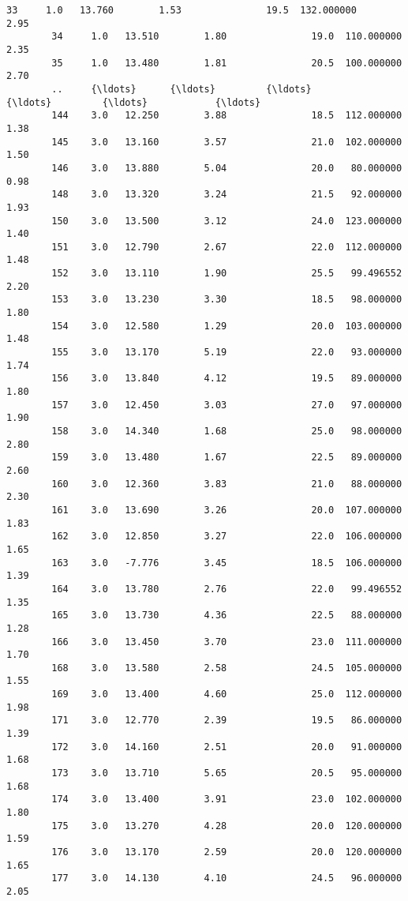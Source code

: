 \documentclass[11pt]{article}
\begin{document}
\begin{Verbatim}[commandchars=\\\{\}]
        33     1.0   13.760        1.53               19.5  132.000000           2.95   
        34     1.0   13.510        1.80               19.0  110.000000           2.35   
        35     1.0   13.480        1.81               20.5  100.000000           2.70   
        ..     {\ldots}      {\ldots}         {\ldots}                {\ldots}         {\ldots}            {\ldots}   
        144    3.0   12.250        3.88               18.5  112.000000           1.38   
        145    3.0   13.160        3.57               21.0  102.000000           1.50   
        146    3.0   13.880        5.04               20.0   80.000000           0.98   
        148    3.0   13.320        3.24               21.5   92.000000           1.93   
        150    3.0   13.500        3.12               24.0  123.000000           1.40   
        151    3.0   12.790        2.67               22.0  112.000000           1.48   
        152    3.0   13.110        1.90               25.5   99.496552           2.20   
        153    3.0   13.230        3.30               18.5   98.000000           1.80   
        154    3.0   12.580        1.29               20.0  103.000000           1.48   
        155    3.0   13.170        5.19               22.0   93.000000           1.74   
        156    3.0   13.840        4.12               19.5   89.000000           1.80   
        157    3.0   12.450        3.03               27.0   97.000000           1.90   
        158    3.0   14.340        1.68               25.0   98.000000           2.80   
        159    3.0   13.480        1.67               22.5   89.000000           2.60   
        160    3.0   12.360        3.83               21.0   88.000000           2.30   
        161    3.0   13.690        3.26               20.0  107.000000           1.83   
        162    3.0   12.850        3.27               22.0  106.000000           1.65   
        163    3.0   -7.776        3.45               18.5  106.000000           1.39   
        164    3.0   13.780        2.76               22.0   99.496552           1.35   
        165    3.0   13.730        4.36               22.5   88.000000           1.28   
        166    3.0   13.450        3.70               23.0  111.000000           1.70   
        168    3.0   13.580        2.58               24.5  105.000000           1.55   
        169    3.0   13.400        4.60               25.0  112.000000           1.98   
        171    3.0   12.770        2.39               19.5   86.000000           1.39   
        172    3.0   14.160        2.51               20.0   91.000000           1.68   
        173    3.0   13.710        5.65               20.5   95.000000           1.68   
        174    3.0   13.400        3.91               23.0  102.000000           1.80   
        175    3.0   13.270        4.28               20.0  120.000000           1.59   
        176    3.0   13.170        2.59               20.0  120.000000           1.65   
        177    3.0   14.130        4.10               24.5   96.000000           2.05   
        

\end{Verbatim}
\end{document}
